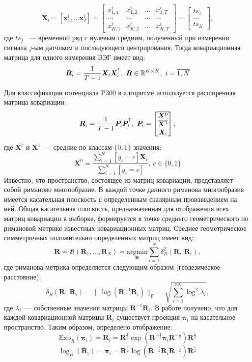 \documentclass[a4paper, 12pt]{extarticle}
\begin{document}
\begin{equation*}
	\bm{X}_i= \left[\bm{x}^i_1,\dots \bm{x}^i_{T}\right] = 
	\begin{bmatrix}
	x^i_{1,1} & x^i_{1,2} &  \dots  &  x^i_{1,T}\\
	\dots & \dots &  \dots  &  \dots\\
	x^i_{K,1} & x^i_{K,2} &  \dots  &  x^i_{K,T}
	\end{bmatrix}
	= \begin{bmatrix}
		ts_1\\
		\dots\\
		ts_K
		\end{bmatrix},
	\end{equation*}
где $ts_j$ ~--- временной ряд с нулевым средним, полученный при измерении сигнала $j$-ым датчиком и последующего центрирования.
Тогда ковариационная матрица для одного измерения ЭЭГ имеет вид:
$$\bm{R}_i = \dfrac{1}{T-1}\bm{X}_i\bm{X}_i^{^{\mathsf{T}}}, ~\bm{R} \in \mathbb{R}^{K\times K},~i = \overline{1, N}$$

Для классификации потенциала P300 в алгоритме используется расширенная матрица ковариации:
$$\bm{R}_i = \dfrac{1}{T-1} \bm{P}_i\bm{P}_i^{^{\mathsf{T}}},~\bm{P}_i = \begin{bmatrix}
	\overline{\bm{X}^0}\\
	\overline{\bm{X}^1}\\
	\bm{X}_i
	\end{bmatrix},$$
где $\overline{\bm{X}^c}$ и $\overline{\bm{X}^1}$~--- средние по классам $\{0,1\}$ значения:
$$\overline{\bm{X}^0} = \dfrac{\sum_{i = 1}^N\left[y_i = c\right] \bm{X}_i}{\sum_{i = 1}^N\left[y_i = c\right]},~c\in\{0,1\}$$
Известно, что пространство, состоящее из матриц ковариации, представляет собой 
риманово многообразие\citep{barachant2010riemannian}. 
В каждой точке данного риманова многообразия имеется касательная плоскость с 
определенным скалярным произведением на ней. Общая касательная плоскость, 
предназначенная для отображения всех матриц ковариации в выборке, 
формируется в точке среднего геометрического по римановой метрике 
известных ковариационных матриц. Среднее геометрическое симметричных положительно определенных матриц имеет вид:
$$\bm{R} = \mathfrak{G}\left(\bm{R}_1,\dots,\bm{R}_N\right) = \underset{\bm{R}}{\text{argmin}}\sum_{i = 1}^N
\delta^2_R(\bm{R},~\bm{R}_i),$$
где риманова метрика определяется следующим образом (геодезическое расстояние):
$$\delta_R(\bm{R},~\bm{R}_i) = \|\log (\bm{R}^{-1}\bm{R}_i)\|_F = \sqrt{\sum_{i = 1}^{3N} \log^2\lambda_i},$$
где $\lambda_i$~--- собственные значения матрицы $\bm{R}^{-1}\bm{R}_i$. В работе \citep{barachant2010riemannian}
получено, что для каждой ковариационной матрицы $\bm{R}_i$ существует проекция $\bm{\pi}_i$ на касательное пространство.
Таким образом, определено отображение:
$$\text{Exp}_{R}(\bm{\pi}_i) = \bm{R}_i = \bm{R}^{\frac{1}{2}} \exp\left(\bm{R}^{-\frac{1}{2}}\bm{\pi}_i\bm{R}^{-\frac{1}{2}}\right) \bm{R}^{\frac{1}{2}}$$
$$\log_{R}(\bm{R}_i) = \bm{\pi}_i = \bm{R}^{\frac{1}{2}} \log\left(\bm{R}^{-\frac{1}{2}}\bm{R}_i\bm{R}^{-\frac{1}{2}}\right) \bm{R}^{\frac{1}{2}}$$
\end{document}
